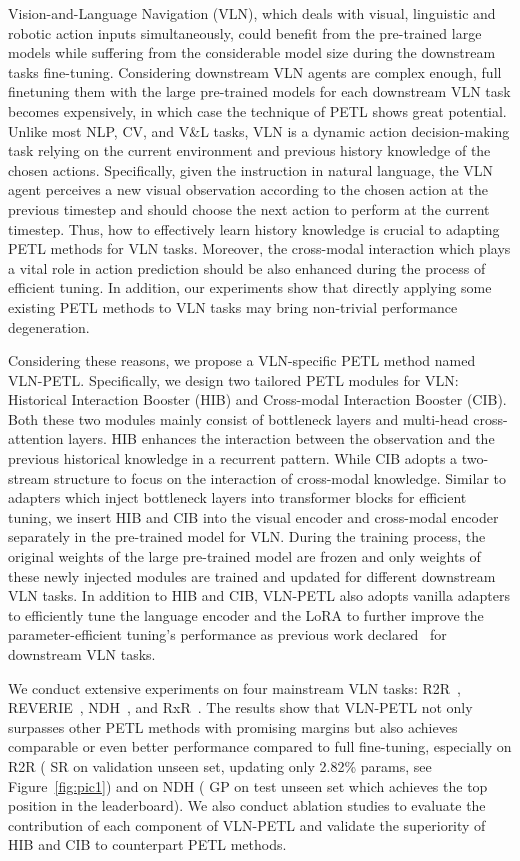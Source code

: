 \documentclass[10pt,twocolumn,letterpaper]{article}
\begin{document}
Vision-and-Language Navigation (VLN), which deals with visual, linguistic and robotic action inputs simultaneously, could benefit from the pre-trained large models while suffering from the considerable model size during the downstream tasks fine-tuning. Considering downstream VLN agents are complex enough, full finetuning them with the large pre-trained models for each downstream VLN task becomes expensively, in which case the technique of PETL shows great potential.
Unlike most NLP, CV, and V\&L tasks, VLN is a dynamic action decision-making task relying on the current environment and previous history knowledge of the chosen actions. Specifically, given the instruction in natural language, the VLN agent perceives a new visual observation according to the chosen action at the previous timestep and should choose the next action to perform at the current timestep. Thus, how to effectively learn history knowledge is crucial to adapting PETL methods for VLN tasks. Moreover, the cross-modal interaction which plays a vital role in action prediction should be also enhanced during the process of efficient tuning. In addition, our experiments show that directly applying some existing PETL methods to VLN tasks may bring non-trivial performance degeneration.

Considering these reasons, we propose a VLN-specific PETL method named VLN-PETL. 
Specifically, we design two tailored PETL modules for VLN: Historical Interaction Booster (HIB) and Cross-modal Interaction Booster (CIB). Both these two modules mainly consist of bottleneck layers and multi-head cross-attention layers.
HIB enhances the interaction between the observation and the previous historical knowledge in a recurrent pattern.
While CIB adopts a two-stream structure to focus on the interaction of cross-modal knowledge. 
Similar to adapters which inject bottleneck layers into transformer blocks for efficient tuning, we insert HIB and CIB into the visual encoder and cross-modal encoder separately in the pre-trained model for VLN. During the training process, the original weights of the large pre-trained model are frozen and only weights of these newly injected modules are trained and updated for different downstream VLN tasks.
In addition to HIB and CIB, VLN-PETL also adopts vanilla adapters to efficiently tune the language encoder and the LoRA to further improve the parameter-efficient tuning's performance as previous work declared~\cite{unified-petl,unipelt,zhang2022hyperpelt} for downstream VLN tasks.

We conduct extensive experiments on four mainstream VLN tasks: R2R~\cite{r2r}, REVERIE~\cite{reverie}, NDH~\cite{ndh}, and RxR~\cite{rxr}. The results show that VLN-PETL not only surpasses other PETL methods with promising margins but also achieves comparable or even better performance compared to full fine-tuning, especially on R2R ( SR on validation unseen set, updating only 2.82\% params, see Figure~\ref{fig:pic1}) and on NDH ( GP on test unseen set which achieves the top position in the leaderboard). We also conduct ablation studies to evaluate the contribution of each component of VLN-PETL and validate the superiority of HIB and CIB to counterpart PETL methods.
\end{document}
